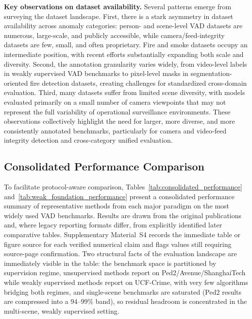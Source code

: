 \documentclass[10pt,a4paper]{article}
\begin{document}
\textbf{Key observations on dataset availability.} Several patterns emerge from surveying the dataset landscape. First, there is a stark asymmetry in dataset availability across anomaly categories: person- and scene-level VAD datasets are numerous, large-scale, and publicly accessible, while camera/feed-integrity datasets are few, small, and often proprietary. Fire and smoke datasets occupy an intermediate position, with recent efforts substantially expanding both scale and diversity. Second, the annotation granularity varies widely, from video-level labels in weakly supervised VAD benchmarks to pixel-level masks in segmentation-oriented fire detection datasets, creating challenges for standardized cross-domain evaluation. Third, many datasets suffer from limited scene diversity, with models evaluated primarily on a small number of camera viewpoints that may not represent the full variability of operational surveillance environments. These observations collectively highlight the need for larger, more diverse, and more consistently annotated benchmarks, particularly for camera and video-feed integrity detection and cross-category unified evaluation.


\subsection{Consolidated Performance Comparison}
\label{subsec:consolidated}
\label{subsec:performance_analysis}

To facilitate protocol-aware comparison, Tables~\ref{tab:consolidated_performance} and~\ref{tab:weak_foundation_performance} present a consolidated performance summary of representative methods from each major paradigm on the most widely used VAD benchmarks. Results are drawn from the original publications and, where legacy reporting formats differ, from explicitly identified later comparative tables. Supplementary Material~S4 records the immediate table or figure source for each verified numerical claim and flags values still requiring source-page confirmation. Two structural facts of the evaluation landscape are immediately visible in the table: the benchmark space is partitioned by supervision regime, unsupervised methods report on Ped2/Avenue/ShanghaiTech while weakly supervised methods report on UCF-Crime, with very few algorithms bridging both regimes, and single-scene benchmarks are saturated (Ped2 results are compressed into a 94--99\% band), so residual headroom is concentrated in the multi-scene, weakly supervised setting.
\end{document}
